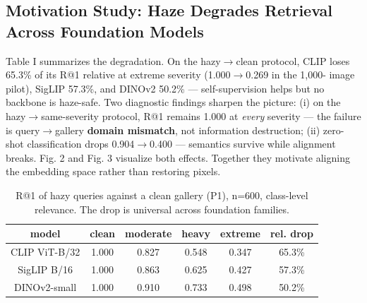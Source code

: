 \documentclass[journal]{IEEEtran}
\begin{document}
\subsection{Motivation Study: Haze Degrades Retrieval Across Foundation Models}
Table I summarizes the degradation. On the hazy$\rightarrow$clean protocol, CLIP loses
65.3\% of its R@1 relative at extreme severity (1.000$\rightarrow$0.269 in the 1,000-
image pilot), SigLIP 57.3\%, and DINOv2 50.2\% --- self-supervision helps but
no backbone is haze-safe. Two diagnostic findings sharpen the picture:
(i) on the hazy$\rightarrow$same-severity protocol, R@1 remains 1.000 at \emph{every}
severity --- the failure is query$\rightarrow$gallery \textbf{domain mismatch}, not
information destruction; (ii) zero-shot classification drops 0.904$\rightarrow$0.400 ---
semantics survive while alignment breaks. Fig. 2 and Fig. 3 visualize both
effects. Together they motivate aligning the embedding space rather than
restoring pixels.
\begin{table}[!t]
\caption{R@1 of hazy queries against a clean gallery (P1), n=600, class-level relevance. The drop is universal across foundation families.}
\label{tab:r1ofhazyqueries}
\centering\footnotesize\setlength{\tabcolsep}{4pt}
\begin{tabular}{@{}cccccc@{}}\toprule
\textbf{model} & \textbf{clean} & \textbf{moderate} & \textbf{heavy} & \textbf{extreme} & \textbf{rel. drop} \\
\midrule
CLIP ViT-B/32 & 1.000 & 0.827 & 0.548 & 0.347 & 65.3\% \\
SigLIP B/16 & 1.000 & 0.863 & 0.625 & 0.427 & 57.3\% \\
DINOv2-small & 1.000 & 0.910 & 0.733 & 0.498 & 50.2\% \\
\bottomrule\end{tabular}
\end{table}
\end{document}
